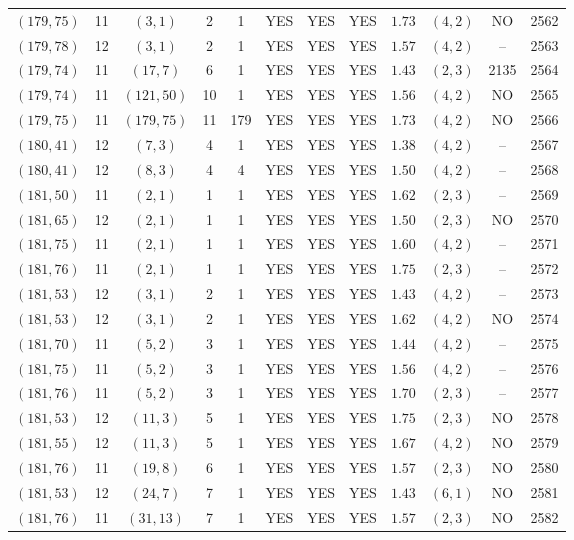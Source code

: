 \begin{longtable}{|c|c|c|c|c|c|c|c|c|c|c|c|}
$(179,75)$ & 11 & $(3,1)$ & 2 & 1 & YES & YES & YES & $1.73$ & $(4,2)$ & NO & 2562\\
$(179,78)$ & 12 & $(3,1)$ & 2 & 1 & YES & YES & YES & $1.57$ & $(4,2)$ & -- & 2563\\
$(179,74)$ & 11 & $(17,7)$ & 6 & 1 & YES & YES & YES & $1.43$ & $(2,3)$ & 2135 & 2564\\
$(179,74)$ & 11 & $(121,50)$ & 10 & 1 & YES & YES & YES & $1.56$ & $(4,2)$ & NO & 2565\\
$(179,75)$ & 11 & $(179,75)$ & 11 & 179 & YES & YES & YES & $1.73$ & $(4,2)$ & NO & 2566\\
$(180,41)$ & 12 & $(7,3)$ & 4 & 1 & YES & YES & YES & $1.38$ & $(4,2)$ & -- & 2567\\
$(180,41)$ & 12 & $(8,3)$ & 4 & 4 & YES & YES & YES & $1.50$ & $(4,2)$ & -- & 2568\\
$(181,50)$ & 11 & $(2,1)$ & 1 & 1 & YES & YES & YES & $1.62$ & $(2,3)$ & -- & 2569\\
$(181,65)$ & 12 & $(2,1)$ & 1 & 1 & YES & YES & YES & $1.50$ & $(2,3)$ & NO & 2570\\
$(181,75)$ & 11 & $(2,1)$ & 1 & 1 & YES & YES & YES & $1.60$ & $(4,2)$ & -- & 2571\\
$(181,76)$ & 11 & $(2,1)$ & 1 & 1 & YES & YES & YES & $1.75$ & $(2,3)$ & -- & 2572\\
$(181,53)$ & 12 & $(3,1)$ & 2 & 1 & YES & YES & YES & $1.43$ & $(4,2)$ & -- & 2573\\
$(181,53)$ & 12 & $(3,1)$ & 2 & 1 & YES & YES & YES & $1.62$ & $(4,2)$ & NO & 2574\\
$(181,70)$ & 11 & $(5,2)$ & 3 & 1 & YES & YES & YES & $1.44$ & $(4,2)$ & -- & 2575\\
$(181,75)$ & 11 & $(5,2)$ & 3 & 1 & YES & YES & YES & $1.56$ & $(4,2)$ & -- & 2576\\
$(181,76)$ & 11 & $(5,2)$ & 3 & 1 & YES & YES & YES & $1.70$ & $(2,3)$ & -- & 2577\\
$(181,53)$ & 12 & $(11,3)$ & 5 & 1 & YES & YES & YES & $1.75$ & $(2,3)$ & NO & 2578\\
$(181,55)$ & 12 & $(11,3)$ & 5 & 1 & YES & YES & YES & $1.67$ & $(4,2)$ & NO & 2579\\
$(181,76)$ & 11 & $(19,8)$ & 6 & 1 & YES & YES & YES & $1.57$ & $(2,3)$ & NO & 2580\\
$(181,53)$ & 12 & $(24,7)$ & 7 & 1 & YES & YES & YES & $1.43$ & $(6,1)$ & NO & 2581\\
$(181,76)$ & 11 & $(31,13)$ & 7 & 1 & YES & YES & YES & $1.57$ & $(2,3)$ & NO & 2582\\

\end{longtable}
